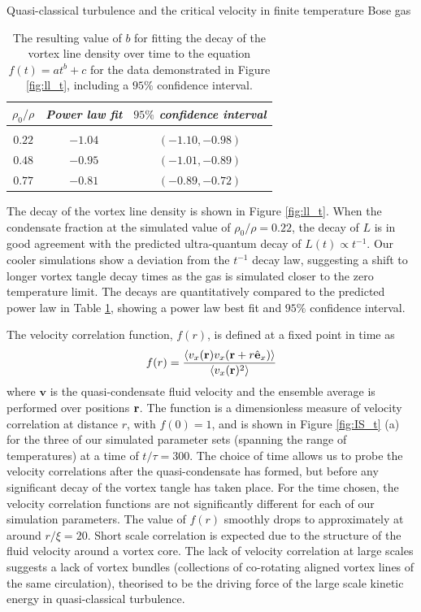 \begin{chapter}{\label{cha:nonequib}Quasi-classical turbulence and the critical velocity in finite temperature Bose gas}
\begin{table}
\centering
\begin{tabular}{ccc}
{\it $\rho_0/\rho$} & {\it Power law fit} & {\it $95\%$ confidence interval} \\
\hline \\ [-2ex]
$0.22$ & $-1.04$ & $(-1.10, -0.98)$\\
$0.48$ & $-0.95$ & $(-1.01, -0.89)$\\
$0.77$ & $-0.81$ & $(-0.89, -0.72)$\\
\hline
\end{tabular}
\caption{The resulting value of $b$ for fitting the decay of the vortex line density over time to the equation $f(t) = at^b+c$ for the data demonstrated in Figure \ref{fig:ll_t}, including a $95\%$ confidence interval.}
\label{tbl:fits}
\end{table}

The decay of the vortex line density is shown in Figure \ref{fig:ll_t}. When the condensate fraction at the simulated value of $\rho_0/\rho = 0.22$, the decay of $L$ is in good agreement with the predicted ultra-quantum decay of $L(t) \propto t^{-1}$. Our cooler simulations show a deviation from the $t^{-1}$ decay law, suggesting a shift to longer vortex tangle decay times as the gas is simulated closer to the zero temperature limit. The decays are quantitatively compared to the predicted power law in Table \ref{tbl:fits}, showing a power law best fit and $95\%$ confidence interval.

The velocity correlation function, $f(r)$, is defined at a fixed point in time as
\begin{equation}
f(r) = \frac{\langle v_x({\bf r})v_x({\bf r} +  r\hat{\bf e}_x) \rangle}{\langle v_x({\bf r})^2 \rangle}
\end{equation}
where $\mathbf{v}$ is the quasi-condensate fluid velocity and the ensemble average is performed over positions ${\bf r}$. The function is a dimensionless measure of velocity correlation at distance $r$, with $f(0)=1$, and is shown in Figure \ref{fig:IS_t} (a) for the three of our simulated parameter sets (spanning the range of temperatures) at a time of $t/\tau = 300$. The choice of time allows us to probe the velocity correlations after the quasi-condensate has formed, but before any significant decay of the vortex tangle has taken place. For the time chosen, the velocity correlation functions are not significantly different for each of our simulation parameters. The value of $f(r)$ smoothly drops to approximately at around $r/\xi = 20$. Short scale correlation is expected due to the structure of the fluid velocity around a vortex core. The lack of velocity correlation at large scales suggests a lack of vortex bundles (collections of co-rotating aligned vortex lines of the same circulation), theorised to be the driving force of the large scale kinetic energy in quasi-classical turbulence.


\end{chapter}
